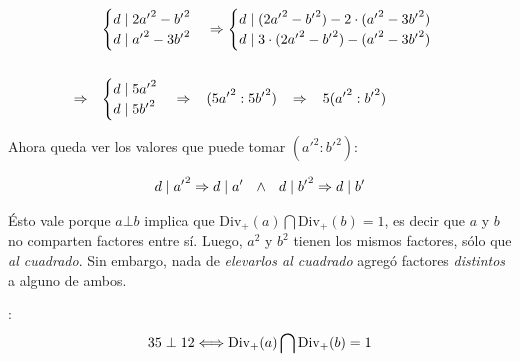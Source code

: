 \documentclass{article}
\newcommand{\nln}{\par\vspace{3mm}}
\newcommand{\myuline}[1]{%
  \uline{\phantom{#1}}%
  \llap{\contour{white}{#1}}%
}
\begin{document}
\begin{align*}
     &\begin{cases}
       d \mid 2 {a'}^2 - {b'}^2 \\ 
       d \mid {a'}^2 - 3{b'}^2
     \end{cases}
     \Rightarrow
     \begin{cases}
       d \mid (2 {a'}^2 - {b'}^2) - 2 \cdot ({a'}^2 - 3{b'}^2) \\ 
       d \mid 3 \cdot (2{a'}^2 - {b'}^2) - ({a'}^2 - 3{b'}^2)
     \end{cases}
     \\ \\
     \Rightarrow
     \hspace{3mm}&\begin{cases}
       d \mid 5{a'}^2 \\ 
       d \mid 5{b'}^2
     \end{cases}
     \Rightarrow \hspace{3mm}
     (5{a'}^2 : 5{b'}^2) \hspace{3mm}
     \Rightarrow \hspace{3mm} 5 ({a'}^2 : {b'}^2)
\end{align*}

Ahora queda ver los valores que puede tomar $({a'}^2:{b'}^2)$:

\begin{align*}
    d \mid {a'}^2 \Rightarrow d \mid a' \hspace{2.5mm} \land \hspace{2.5mm} d \mid {b'}^2 \Rightarrow d \mid b'
\end{align*}


Ésto vale porque $a \bot b$ implica que $\text{Div}_{+}(a) \bigcap \text{Div}_{+}(b) = 1$, es decir que
$a$ y $b$ no comparten factores entre sí. Luego, $a^2$ y $b^2$ tienen los mismos factores, sólo que \textit{al cuadrado}. Sin embargo, nada de \textit{elevarlos al cuadrado} agregó factores \textit{distintos} a alguno de ambos.
\nln
\textit{\myuline{Ejemplo}}:
\begin{align*}
    35 \hspace{1mm} \bot \hspace{1mm} 12 \Longleftrightarrow \text{Div}_{+}(a) \bigcap \text{Div}_{+}(b) = 1
\end{align*}
\end{document}
